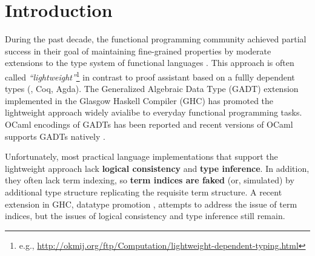 \section{Introduction}
During the past decade, the functional programming community achieved
partial success in their goal of maintaining fine-grained properties
by moderate extensions to the type system of functional languages
\cite{CheHin03,CheHin02,Xi03}.
This approach is often called \emph{``lightweight''}\footnote{e.g.,
  \url{http://okmij.org/ftp/Computation/lightweight-dependent-typing.html} }
in contrast to proof assistant based on a fullly dependent types
(\eg, Coq, Agda).
The Generalized Algebraic Data Type (GADT) extension implemented
in the Glasgow Haskell Compiler (GHC) has promoted the lightweight approach
widely avialibe to everyday functional programming tasks.
OCaml encodings of GADTs has been reported \cite{ManStu09}
and recent versions of OCaml supports GADTs natively \cite{GarNor11}.

Unfortunately, most practical language implementations that support
the lightweight approach lack \textbf{logical consistency} and
\textbf{type inference}. In addition,
they often lack term indexing, so \textbf{term indices are faked}
(or, simulated) by additional type structure replicating the requisite term
structure.
A recent extension in GHC, datatype promotion \cite{YorgeyWCJVM12},
attempts to address the issue of term indices, but the issues of
logical consistency and type inference still remain.

